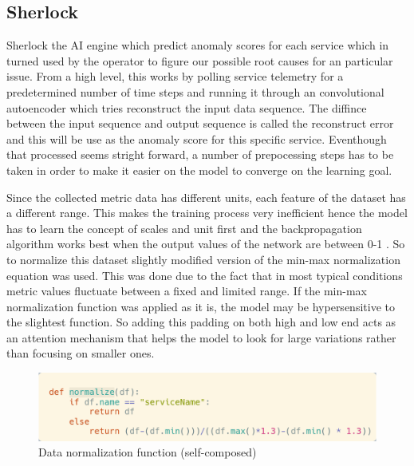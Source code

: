 \subsection{Sherlock}

Sherlock the AI engine which predict anomaly scores for each service which in turned used by the operator to figure our possible root causes for an particular issue. From a high level, this works by polling service telemetry for a predetermined number of time steps and running it through an convolutional autoencoder which tries reconstruct the input data sequence. The diffince between the input sequence and output sequence is called the reconstruct error and this will be use as the anomaly score for this specific service. Eventhough that processed seems stright forward, a number of prepocessing steps has to be taken in order to make it easier on the model to converge on the learning goal.

Since the collected metric data has different units, each feature of the dataset has a different range. This makes the training process very inefficient hence the model has to learn the concept of scales and unit first and the backpropagation algorithm works best when the output values of the network are between 0-1 \citep{sola1997importance}. So to normalize this dataset slightly modified version of the min-max normalization equation was used. This was done due to the fact that in most typical conditions metric values fluctuate between a fixed and limited range. If the min-max normalization function was applied as it is, the model may be hypersensitive to the slightest function. So adding this padding on both high and low end acts as an attention mechanism that helps the model to look for large variations rather than focusing on smaller ones.

\begin{figure}[H]
    \includegraphics[width=14cm]{assets/implementation/normalize-data.png}
    \caption{Data normalization function (self-composed)}
    \label{fig:normalize-data}
\end{figure}


